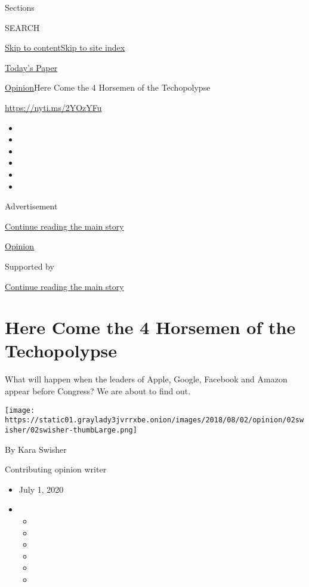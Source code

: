 Sections

SEARCH

\protect\hyperlink{site-content}{Skip to
content}\protect\hyperlink{site-index}{Skip to site index}

\href{https://myaccount.nytimes3xbfgragh.onion/auth/login?response_type=cookie\&client_id=vi}{}

\href{https://www.nytimes3xbfgragh.onion/section/todayspaper}{Today's
Paper}

\href{/section/opinion}{Opinion}\textbar{}Here Come the 4 Horsemen of
the Techopolypse

\url{https://nyti.ms/2YOzYFu}

\begin{itemize}
\item
\item
\item
\item
\item
\item
\end{itemize}

Advertisement

\protect\hyperlink{after-top}{Continue reading the main story}

\href{/section/opinion}{Opinion}

Supported by

\protect\hyperlink{after-sponsor}{Continue reading the main story}

\hypertarget{here-come-the-4-horsemen-of-the-techopolypse}{%
\section{Here Come the 4 Horsemen of the
Techopolypse}\label{here-come-the-4-horsemen-of-the-techopolypse}}

What will happen when the leaders of Apple, Google, Facebook and Amazon
appear before Congress? We are about to find out.

\texttt{[image: https://static01.graylady3jvrrxbe.onion/images/2018/08/02/opinion/02swisher/02swisher-thumbLarge.png]}

By Kara Swisher

Contributing opinion writer

\begin{itemize}
\item
  July 1, 2020
\item
  \begin{itemize}
  \item
  \item
  \item
  \item
  \item
  \item
  \end{itemize}
\end{itemize}

